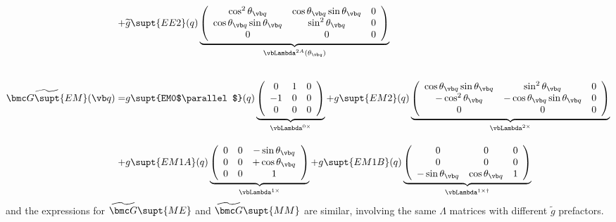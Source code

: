 \documentclass[letterpaper]{article}
\renewcommand{\wt}{\widetilde}
\begin{document}
\begin{align*}
  +&\wt{g}\supt{EE2}(q)
    \underbrace{
   \left(\begin{array}{ccc}
    \cos^2\theta_{\vb q}  & \cos\theta_{\vb q} \sin\theta_{\vb q} & 0 \\
    \cos\theta_{\vb q} \sin\theta_{\vb q} & \sin^2\theta_{\vb q}  & 0 \\
    0                     & 0                    & 0 
   \end{array}\right)
               }_{\vbLambda^{2A}(\theta_{\vb q})}
\\[20pt]
 \wt{\bmc G\supt{EM}}(\vb q)
 = &g\supt{EM0$\parallel$}(q)
    \underbrace{ \left(\begin{array}{ccc}
                       0 & 1 & 0 \\ 
                      -1 & 0 & 0 \\ 
                       0 & 0 & 0 
                 \end{array}\right)
               }_{\vbLambda^{0\times}}
  +g\supt{EM2}(q)
   \underbrace{
   \left(\begin{array}{ccc}
    \cos\theta_{\vb q} \sin\theta_{\vb q} & \sin^2\theta_{\vb q} & 0 \\
    -\cos^2\theta_{\vb q} & -\cos\theta_{\vb q} \sin\theta_{\vb q} & 0 \\
    0                     & 0                    & 0 
   \end{array}\right)
              }_{\vbLambda^{2\times}}
\\[10pt]
  + &g\supt{EM1A}(q)
   \underbrace{
    \left(\begin{array}{ccc}
    0 & 0 & -\sin\theta_{\vb q} \\
    0 & 0 & +\cos\theta_{\vb q} \\
    0 & 0 & 1
   \end{array}\right)
              }_{\vbLambda^{1\times}}
  + g\supt{EM1B}(q)
   \underbrace{
    \left(\begin{array}{ccc}
    0 & 0 & 0 \\
    0 & 0 & 0 \\
   -\sin\theta_{\vb q} & \cos\theta_{\vb q} & 1
   \end{array}\right)
              }_{\vbLambda^{1\times\dagger}}
\end{align*}
and the expressions for $\wt{\bmc G}\supt{ME}$ and $\wt{\bmc G}\supt{MM}$
are similar, involving the same $\Lambda$ matrices with different 
$\wt{g}$ prefactors.
\end{document}
